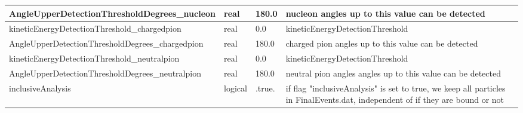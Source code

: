 \documentclass{article}
\begin{document}
\begin{longtable}{llll}
\midrule
AngleUpperDetectionThresholdDegrees\_nucleon & \begin{minipage}[t]{2cm}real\end{minipage} & \begin{minipage}[t]{2cm}180.0\end{minipage} & \begin{minipage}[t]{12cm}nucleon angles up to this value can be detected\end{minipage}\\*
\midrule
kineticEnergyDetectionThreshold\_chargedpion & \begin{minipage}[t]{2cm}real\end{minipage} & \begin{minipage}[t]{2cm}0.0\end{minipage} & \begin{minipage}[t]{12cm}kineticEnergyDetectionThreshold\end{minipage}\\*
\midrule
AngleUpperDetectionThresholdDegrees\_chargedpion & \begin{minipage}[t]{2cm}real\end{minipage} & \begin{minipage}[t]{2cm}180.0\end{minipage} & \begin{minipage}[t]{12cm}charged pion angles up to this value can be detected\end{minipage}\\*
\midrule
kineticEnergyDetectionThreshold\_neutralpion & \begin{minipage}[t]{2cm}real\end{minipage} & \begin{minipage}[t]{2cm}0.0\end{minipage} & \begin{minipage}[t]{12cm}kineticEnergyDetectionThreshold\end{minipage}\\*
\midrule
AngleUpperDetectionThresholdDegrees\_neutralpion & \begin{minipage}[t]{2cm}real\end{minipage} & \begin{minipage}[t]{2cm}180.0\end{minipage} & \begin{minipage}[t]{12cm}neutral pion angles angles up to this value can be detected\end{minipage}\\*
\midrule
inclusiveAnalysis & \begin{minipage}[t]{2cm}logical\end{minipage} & \begin{minipage}[t]{2cm}.true.\end{minipage} & \begin{minipage}[t]{12cm}if flag "inclusiveAnalysis" is set to true, we keep all particles in FinalEvents.dat, independent of if they are bound or not\end{minipage}\\*

\end{longtable}
\end{document}
